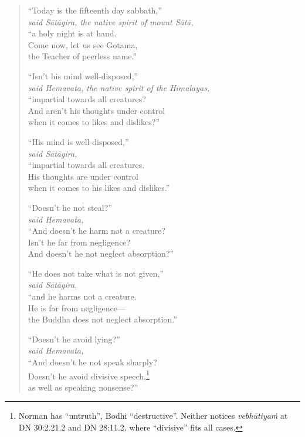 \documentclass[12pt,openany]{book}%
\newcommand*{\scspeaker}[1]{\hspace{2em}\textit{#1}}
\begin{document}
\begin{verse}%
“Today is the fifteenth day sabbath,” \\
\scspeaker{said \textsanskrit{Sātāgira}, the native spirit of mount \textsanskrit{Sātā}, }\\
“a holy night is at hand. \\
Come now, let us see Gotama, \\
the Teacher of peerless name.” 

“Isn’t his mind well-disposed,” \\
\scspeaker{said Hemavata, the native spirit of the Himalayas, }\\
“impartial towards all creatures? \\
And aren’t his thoughts under control \\
when it comes to likes and dislikes?” 

“His mind is well-disposed,” \\
\scspeaker{said \textsanskrit{Sātāgira}, }\\
“impartial towards all creatures. \\
His thoughts are under control \\
when it comes to his likes and dislikes.” 

“Doesn’t he not steal?” \\
\scspeaker{said Hemavata, }\\
“And doesn’t he harm not a creature? \\
Isn’t he far from negligence? \\
And doesn’t he not neglect absorption?” 

“He does not take what is not given,” \\
\scspeaker{said \textsanskrit{Sātāgira}, }\\
“and he harms not a creature. \\
He is far from negligence—\\
the Buddha does not neglect absorption.” 

“Doesn’t he avoid lying?” \\
\scspeaker{said Hemavata, }\\
“And doesn’t he not speak sharply? \\
Doesn’t he avoid divisive speech,\footnote{Norman has “untruth”, Bodhi “destructive”. Neither notices \textit{\textsanskrit{vebhūtiyaṁ}} at  DN 30:2.21.2 and DN 28:11.2, where “divisive” fits all cases. } \\
as well as speaking nonsense?” 


\end{verse}
\end{document}
